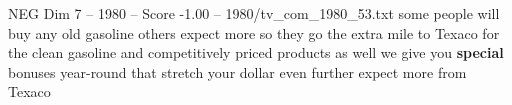 \begin{textsample}{NEG Dim 7 – 1980 – Score -1.00 – 1980/tv\_com\_1980\_53.txt}  \label{ex:f7_neg_049}
some people will buy any old gasoline others expect more so they go the extra mile to Texaco for the clean gasoline and competitively priced products as well we give you \textbf{special} bonuses year-round that stretch your dollar even further expect more from Texaco

\end{textsample}
